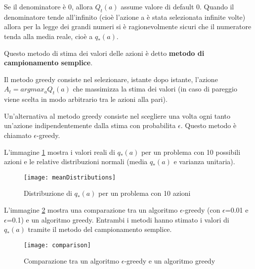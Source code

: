 Se il denominatore è 0, allora $Q_t(a)$ assume valore di default 0.
Quando il denominatore tende all'infinito (cioè l'azione a è stata selezionata
infinite volte) allora per la legge dei grandi numeri si è ragionevolmente sicuri che
il numeratore tenda alla media reale, cioè a $q_*(a)$.

Questo metodo di stima dei valori delle azioni è detto \textbf{metodo di campionamento
semplice}.

Il metodo greedy consiste nel selezionare, istante dopo istante, l'azione
$A_t = argmax_a Q_t(a)$ che massimizza la stima dei valori (in caso di pareggio viene
scelta in modo arbitrario tra le azioni alla pari).

Un'alternativa al metodo greedy consiste nel scegliere una volta ogni tanto un'azione
indipendentemente dalla stima con probabilita $\epsilon$. Questo metodo è chiamato
$\epsilon$-greedy.

L'immagine \ref{fig:meanDistributions} mostra i valori reali di $q_*(a)$ per un
problema con 10 possibili azioni e le relative distribuzioni normali (media $q_*(a)$
e varianza unitaria).

\begin{figure}[H]
\centering
\texttt{[image: meanDistributions]}
\caption{Distribuzione di $q_*(a)$ per un problema con 10 azioni}
\label{fig:meanDistributions}
\end{figure}

L'immagine \ref{fig:comparison} mostra una comparazione tra un algoritmo
$\epsilon$-greedy (con $\epsilon$=0.01 e $\epsilon$=0.1) e un algoritmo greedy.
Entrambi i metodi hanno stimato i valori di $q_*(a)$ tramite il metodo del
campionamento semplice.

\begin{figure}[H]
\centering
\texttt{[image: comparison]}
\caption{Comparazione tra un algoritmo $\epsilon$-greedy e un algoritmo greedy}
\label{fig:comparison}
\end{figure}

